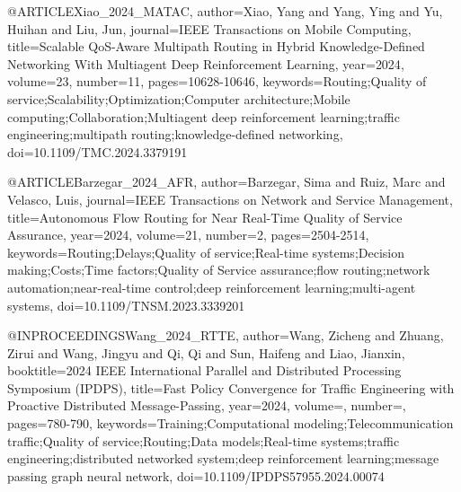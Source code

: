 @ARTICLE{Xiao_2024_MATAC,
  author={Xiao, Yang and Yang, Ying and Yu, Huihan and Liu, Jun},
  journal={IEEE Transactions on Mobile Computing}, 
  title={{Scalable QoS-Aware Multipath Routing in Hybrid Knowledge-Defined Networking With Multiagent Deep Reinforcement Learning}}, 
  year={2024},
  volume={23},
  number={11},
  pages={10628-10646},
  keywords={Routing;Quality of service;Scalability;Optimization;Computer architecture;Mobile computing;Collaboration;Multiagent deep reinforcement learning;traffic engineering;multipath routing;knowledge-defined networking},
  doi={10.1109/TMC.2024.3379191}}


@ARTICLE{Barzegar_2024_AFR,
  author={Barzegar, Sima and Ruiz, Marc and Velasco, Luis},
  journal={IEEE Transactions on Network and Service Management}, 
  title={{Autonomous Flow Routing for Near Real-Time Quality of Service Assurance}}, 
  year={2024},
  volume={21},
  number={2},
  pages={2504-2514},
  keywords={Routing;Delays;Quality of service;Real-time systems;Decision making;Costs;Time factors;Quality of Service assurance;flow routing;network automation;near-real-time control;deep reinforcement learning;multi-agent systems},
  doi={10.1109/TNSM.2023.3339201}}


@INPROCEEDINGS{Wang_2024_RTTE,
  author={Wang, Zicheng and Zhuang, Zirui and Wang, Jingyu and Qi, Qi and Sun, Haifeng and Liao, Jianxin},
  booktitle={2024 IEEE International Parallel and Distributed Processing Symposium (IPDPS)}, 
  title={{Fast Policy Convergence for Traffic Engineering with Proactive Distributed Message-Passing}}, 
  year={2024},
  volume={},
  number={},
  pages={780-790},
  keywords={Training;Computational modeling;Telecommunication traffic;Quality of service;Routing;Data models;Real-time systems;traffic engineering;distributed networked system;deep reinforcement learning;message passing graph neural network},
  doi={10.1109/IPDPS57955.2024.00074}}




